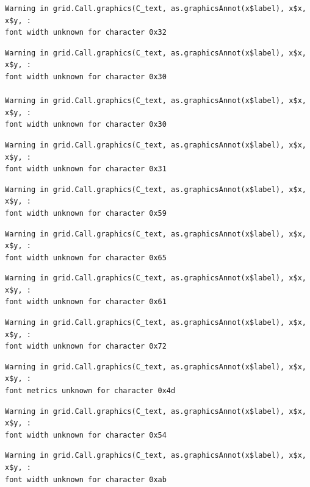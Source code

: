 \documentclass[
  letterpaper,
  DIV=11,
  numbers=noendperiod]{scrreprt}
\begin{document}
\begin{verbatim}
Warning in grid.Call.graphics(C_text, as.graphicsAnnot(x$label), x$x, x$y, :
font width unknown for character 0x32
\end{verbatim}

\begin{verbatim}
Warning in grid.Call.graphics(C_text, as.graphicsAnnot(x$label), x$x, x$y, :
font width unknown for character 0x30

Warning in grid.Call.graphics(C_text, as.graphicsAnnot(x$label), x$x, x$y, :
font width unknown for character 0x30
\end{verbatim}

\begin{verbatim}
Warning in grid.Call.graphics(C_text, as.graphicsAnnot(x$label), x$x, x$y, :
font width unknown for character 0x31
\end{verbatim}

\begin{verbatim}
Warning in grid.Call.graphics(C_text, as.graphicsAnnot(x$label), x$x, x$y, :
font width unknown for character 0x59
\end{verbatim}

\begin{verbatim}
Warning in grid.Call.graphics(C_text, as.graphicsAnnot(x$label), x$x, x$y, :
font width unknown for character 0x65
\end{verbatim}

\begin{verbatim}
Warning in grid.Call.graphics(C_text, as.graphicsAnnot(x$label), x$x, x$y, :
font width unknown for character 0x61
\end{verbatim}

\begin{verbatim}
Warning in grid.Call.graphics(C_text, as.graphicsAnnot(x$label), x$x, x$y, :
font width unknown for character 0x72
\end{verbatim}

\begin{verbatim}
Warning in grid.Call.graphics(C_text, as.graphicsAnnot(x$label), x$x, x$y, :
font metrics unknown for character 0x4d
\end{verbatim}

\begin{verbatim}
Warning in grid.Call.graphics(C_text, as.graphicsAnnot(x$label), x$x, x$y, :
font width unknown for character 0x54
\end{verbatim}

\begin{verbatim}
Warning in grid.Call.graphics(C_text, as.graphicsAnnot(x$label), x$x, x$y, :
font width unknown for character 0xab
\end{verbatim}
\end{document}
